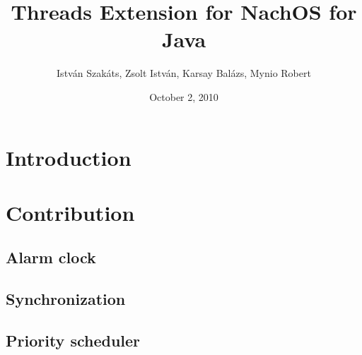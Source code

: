 \documentclass[a4paper,10pt]{article}
\title{Threads Extension for NachOS for Java}
\author{Istv\'{a}n Szak\'{a}ts, Zsolt Istv\'{a}n, Karsay Bal\'{a}zs, Mynio Robert}
\date{October 2, 2010}
\begin{document}
\maketitle

\section{Introduction}


\section{Contribution}

\subsection{Alarm clock}


\subsection{Synchronization}


\subsection{Priority scheduler}

\end{document}
